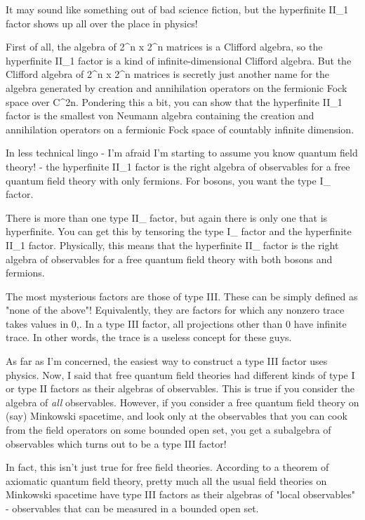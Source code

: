It may sound like something out of bad science fiction, but the
hyperfinite II_{1} factor shows up all over the place in physics!

First of all, the algebra of 2^{n} x 2^{n} matrices is a
Clifford algebra, so the hyperfinite II_{1} factor is a kind of
infinite-dimensional Clifford algebra.  But the Clifford algebra of
2^{n} x 2^{n} matrices is secretly just another name for
the algebra generated by creation and annihilation operators on the
fermionic Fock space over C^{2n}.  Pondering this a bit, you can show
that the hyperfinite II_{1} factor is the smallest von Neumann
algebra containing the creation and annihilation operators on a
fermionic Fock space of countably infinite dimension.

In less technical lingo - I'm afraid I'm starting to assume you know
quantum field theory! - the hyperfinite II_{1} factor is the
right algebra of observables for a free quantum field theory with only
fermions.  For bosons, you want the type I_{\infty } factor.

There is more than one type II_{\infty } factor, but again
there is only one that is hyperfinite.  You can get this by tensoring
the type I_{\infty } factor and the hyperfinite II_{1}
factor.  Physically, this means that the hyperfinite
II_{\infty } factor is the right algebra of observables for a
free quantum field theory with both bosons and fermions.

The most mysterious factors are those of type III.  These can be simply
defined as "none of the above"!  Equivalently, they are factors for 
which any nonzero trace takes values in {0,\infty }.  In a type III
factor, all projections other than 0 have infinite trace.  In other
words, the trace is a useless concept for these guys.  

As far as I'm concerned, the easiest way to construct a type III factor
uses physics.  Now, I said that free quantum field theories had
different kinds of type I or type II factors as their algebras of
observables.  This is true if you consider the algebra of \emph{all}
observables. However, if you consider a free quantum field theory on
(say) Minkowski spacetime, and look only at the observables that you can
cook from the field operators on some bounded open set, you get a
subalgebra of observables which turns out to be a type III factor!  

In fact, this isn't just true for free field theories.  According to a
theorem of axiomatic quantum field theory, pretty much all the usual
field theories on Minkowski spacetime have type III factors as their
algebras of "local observables" - observables that can be measured in
a bounded open set.  

